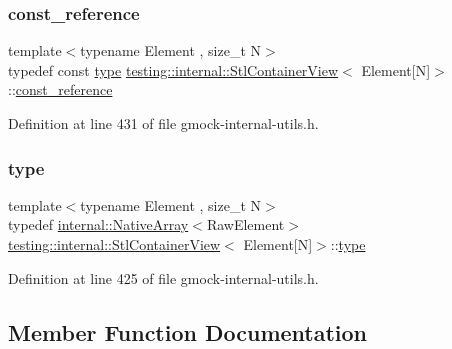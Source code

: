 \subsubsection{\texorpdfstring{const\+\_\+reference}{const\_reference}}
{\footnotesize\ttfamily template$<$typename Element , size\+\_\+t N$>$ \\
typedef const \hyperlink{classtesting_1_1internal_1_1StlContainerView_3_01Element[N]_4_a364efca99cc5a02829b4e3413c506b09}{type} \hyperlink{classtesting_1_1internal_1_1StlContainerView}{testing\+::internal\+::\+Stl\+Container\+View}$<$ Element\mbox{[}N\mbox{]}$>$\+::\hyperlink{classtesting_1_1internal_1_1StlContainerView_3_01Element[N]_4_a481e6ab99316939484fad9c561af5e28}{const\+\_\+reference}}



Definition at line 431 of file gmock-\/internal-\/utils.\+h.

\mbox{\label{classtesting_1_1internal_1_1StlContainerView_3_01Element[N]_4_a364efca99cc5a02829b4e3413c506b09}} 
\subsubsection{\texorpdfstring{type}{type}}
{\footnotesize\ttfamily template$<$typename Element , size\+\_\+t N$>$ \\
typedef \hyperlink{classtesting_1_1internal_1_1NativeArray}{internal\+::\+Native\+Array}$<$Raw\+Element$>$ \hyperlink{classtesting_1_1internal_1_1StlContainerView}{testing\+::internal\+::\+Stl\+Container\+View}$<$ Element\mbox{[}N\mbox{]}$>$\+::\hyperlink{classtesting_1_1internal_1_1StlContainerView_3_01Element[N]_4_a364efca99cc5a02829b4e3413c506b09}{type}}



Definition at line 425 of file gmock-\/internal-\/utils.\+h.



\subsection{Member Function Documentation}
\mbox{\label{classtesting_1_1internal_1_1StlContainerView_3_01Element[N]_4_aa1b15d7f43d38751ae19f6dbdcb6aba3}} 
